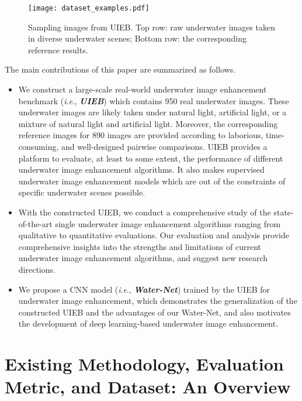 \documentclass[journal]{IEEEtran}
\newcommand{\ie}{\textit{i}.\textit{e}.}
\begin{document}
\begin{figure*}[!htb]
\centering
\texttt{[image: dataset\_examples.pdf]}
\caption{Sampling images from UIEB. Top row: raw underwater images taken in diverse underwater scenes; Bottom row: the corresponding reference results.}
\label{fig_1}
\end{figure*}





The main contributions of this paper are summarized as follows.

\begin{itemize}
  \item We construct a large-scale real-world underwater image enhancement benchmark (\ie, \textbf{\emph{UIEB}}) which contains 950 real underwater images. These underwater images are likely taken under natural light, artificial light, or a mixture of natural light and artificial light. Moreover, the corresponding reference images for 890 images are provided according to laborious, time-consuming, and well-designed pairwise comparisons. UIEB provides a platform to evaluate, at least to some extent, the performance of different underwater image enhancement algorithms. It also makes supervised underwater image enhancement models which are out of the constraints of specific underwater scenes possible.

  \item  With the constructed UIEB, we conduct a comprehensive study of the state-of-the-art single underwater image enhancement algorithms ranging from qualitative to quantitative evaluations. Our evaluation and analysis provide comprehensive insights into the strengths and limitations of current underwater image enhancement algorithms, and suggest new research directions.

  \item We propose a CNN model (\ie, \emph{\textbf{Water-Net}}) trained by the UIEB for underwater image enhancement, which demonstrates the generalization of the constructed UIEB and the advantages of our Water-Net, and also motivates the development of deep learning-based underwater image enhancement.
\end{itemize}





\section{Existing Methodology, Evaluation Metric, and Dataset: An Overview}
\end{document}
